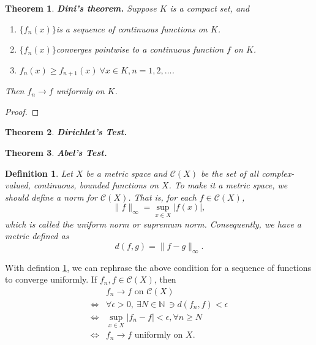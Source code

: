 \documentclass[12pt]{article}
\newtheorem{thm}{Theorem}[section]
\newtheorem{defn}{Definition}[section]
\newcommand{\fseq}{$\{f_n(x)\}$}
\newcommand{\N}{\mathbb{N}}
\begin{document}
\begin{thm} \label{thm:dini}
	\textbf{Dini's theorem.} Suppose $K$ is a compact set, and
	\begin{enumerate}
		\item \fseq is a sequence of continuous functions on $K$.
		\item \fseq converges pointwise to a continuous function $f$ on $K$.
		\item $f_n(x) \geq f_{n+1}(x) ~ \forall x \in K, n = 1, 2, \dots$.
	\end{enumerate}
	Then $f_n \rightarrow f$ uniformly on $K$.
\end{thm}
\begin{proof}
	
\end{proof}

\begin{thm}
	\textbf{Dirichlet's Test.}
\end{thm}

\begin{thm}
	\textbf{Abel's Test.}
\end{thm}

\begin{defn}\label{def:sup_norm}
	Let $X$ be a metric space and $\mathcal{C}(X)$ be the set of all complex-valued, continuous, bounded functions on $X$. To make it a metric space, we should define a norm for $\mathcal{C}(X)$. That is, for each $f  \in \mathcal{C}(X)$, \[ \lVert f \rVert_{\infty} = \sup_{x \in X} |f(x)|, \] which is called the uniform norm or supremum norm. Consequently, we have a metric defined as \[d(f, g) = \lVert f - g \rVert_{\infty}.\]
\end{defn}

With defintion \ref{def:sup_norm}, we can rephrase the above condition for a sequence of functions to converge uniformly. If $f_n, f \in \mathcal{C}(X)$, then
\begin{align*}
	&f_n \rightarrow f \text{ on } \mathcal{C}(X)\\
	\iff &\forall \epsilon > 0, ~ \exists N \in \N ~\ni d(f_n, f) < \epsilon \\ 
	\iff &\sup_{x \in X} |f_n - f| < \epsilon, \forall n \geq N \\
	\iff &f_n \rightarrow f \text{  uniformly on } X.
\end{align*}
\end{document}
